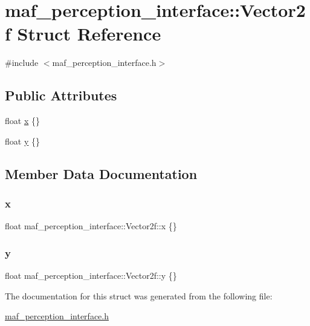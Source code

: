 \hypertarget{structmaf__perception__interface_1_1Vector2f}{}\section{maf\+\_\+perception\+\_\+interface\+:\+:Vector2f Struct Reference}
\label{structmaf__perception__interface_1_1Vector2f}


{\ttfamily \#include $<$maf\+\_\+perception\+\_\+interface.\+h$>$}

\subsection*{Public Attributes}
\begin{DoxyCompactItemize}
\item 
float \hyperlink{structmaf__perception__interface_1_1Vector2f_a0704d36782fa19c17fe3fa962953a572}{x} \{\}
\item 
float \hyperlink{structmaf__perception__interface_1_1Vector2f_a111ee2767bca45af9f2897fba763b0ce}{y} \{\}
\end{DoxyCompactItemize}


\subsection{Member Data Documentation}
\mbox{\label{structmaf__perception__interface_1_1Vector2f_a0704d36782fa19c17fe3fa962953a572}} 
\subsubsection{\texorpdfstring{x}{x}}
{\footnotesize\ttfamily float maf\+\_\+perception\+\_\+interface\+::\+Vector2f\+::x \{\}}

\mbox{\label{structmaf__perception__interface_1_1Vector2f_a111ee2767bca45af9f2897fba763b0ce}} 
\subsubsection{\texorpdfstring{y}{y}}
{\footnotesize\ttfamily float maf\+\_\+perception\+\_\+interface\+::\+Vector2f\+::y \{\}}



The documentation for this struct was generated from the following file\+:\begin{DoxyCompactItemize}
\item 
\hyperlink{maf__perception__interface_8h}{maf\+\_\+perception\+\_\+interface.\+h}\end{DoxyCompactItemize}
